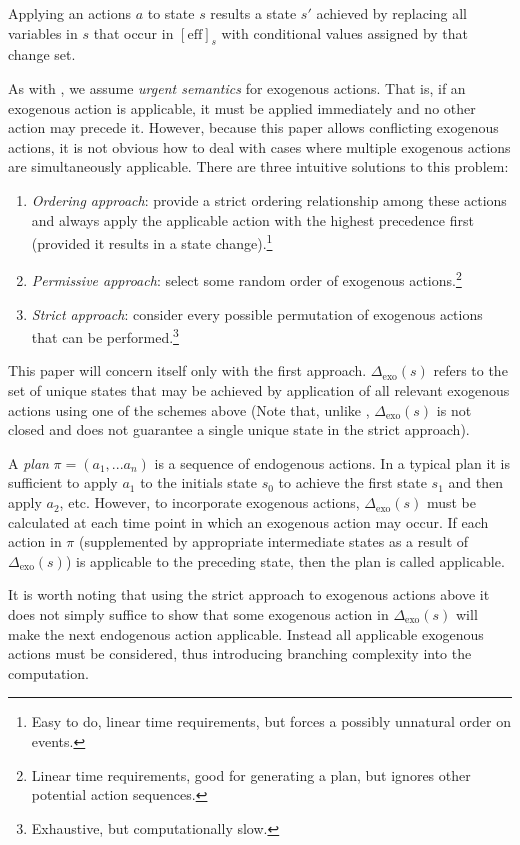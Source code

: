 \documentclass{article}
\theoremstyle{plain}
\theoremstyle{definition}
\begin{document}
Applying an actions $a$ to state $s$ results a state $s'$ achieved by replacing all variables in $s$ that occur in $[\textrm{eff}]_s$ with conditional values assigned by that change set.

As with \cite{lind2019ethical}, we assume \textit{urgent semantics} for exogenous actions. That is, if an exogenous action is applicable, it must be applied immediately and no other action may precede it. However, because this paper allows conflicting exogenous actions, it is not obvious how to deal with cases where multiple exogenous actions are simultaneously applicable. There are three intuitive solutions to this problem:
\begin{enumerate}
\item \textit{Ordering approach}: provide a strict ordering relationship among these actions and always apply the applicable action with the highest precedence first (provided it results in a state change).\footnote{Easy to do, linear time requirements, but forces a possibly unnatural order on events.}
\item \textit{Permissive approach}: select some random order of exogenous actions.\footnote{Linear time requirements, good for generating a plan, but ignores other potential action sequences.}
\item \textit{Strict approach}: consider every possible permutation of exogenous actions that can be performed.\footnote{Exhaustive, but computationally slow.}
\end{enumerate}

This paper will concern itself only with the first approach. $\Delta_{\textrm{exo}}(s)$ refers to the set of unique states that may be achieved by application of all relevant exogenous actions using one of the schemes above (Note that, unlike \cite{lind2019ethical}, $\Delta_{\textrm{exo}}(s)$ is not closed and does not guarantee a single unique state in the strict approach).

A \textit{plan} $\pi=(a_1,...a_n)$ is a sequence of endogenous actions. In a typical plan it is sufficient to apply $a_1$ to the initials state $s_0$ to achieve the first state $s_1$ and then apply $a_2$, etc. However, to incorporate exogenous actions, $\Delta_{\textrm{exo}}(s)$ must be calculated at each time point in which an exogenous action may occur. If each action in $\pi$ (supplemented by appropriate intermediate states as a result of $\Delta_{\textrm{exo}}(s)$) is applicable to the preceding state, then the plan is called applicable. 

It is worth noting that using the strict approach to exogenous actions above it does not simply suffice to show that some exogenous action in $\Delta_{\textrm{exo}}(s)$ will make the next endogenous action applicable. Instead all applicable exogenous actions must be considered, thus introducing branching complexity into the computation.
\end{document}
